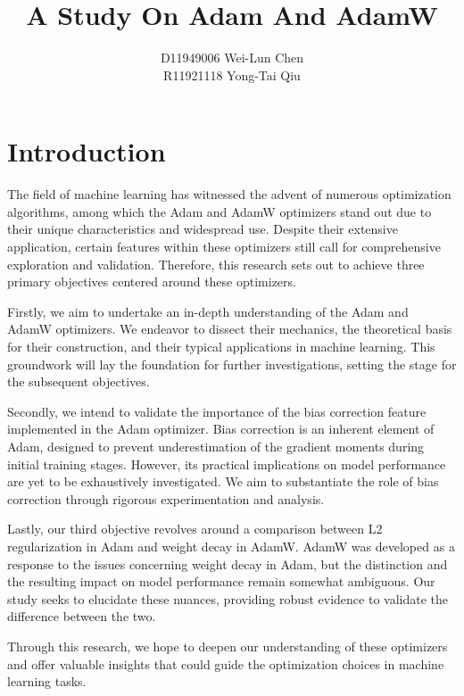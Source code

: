 \documentclass[14pt,twocolumn,letterpaper]{extarticle}
\begin{document}
\title{A Study On Adam And AdamW}
\author{D11949006 Wei-Lun Chen \\ R11921118 Yong-Tai Qiu}
\date{}
\maketitle

\section{Introduction}
The field of machine learning has witnessed the advent of numerous optimization algorithms, among which the Adam and AdamW optimizers stand out due to their unique characteristics and widespread use. Despite their extensive application, certain features within these optimizers still call for comprehensive exploration and validation. Therefore, this research sets out to achieve three primary objectives centered around these optimizers.\par
Firstly, we aim to undertake an in-depth understanding of the Adam and AdamW optimizers. We endeavor to dissect their mechanics, the theoretical basis for their construction, and their typical applications in machine learning. This groundwork will lay the foundation for further investigations, setting the stage for the subsequent objectives.\par
Secondly, we intend to validate the importance of the bias correction feature implemented in the Adam optimizer. Bias correction is an inherent element of Adam, designed to prevent underestimation of the gradient moments during initial training stages. However, its practical implications on model performance are yet to be exhaustively investigated. We aim to substantiate the role of bias correction through rigorous experimentation and analysis.\par
Lastly, our third objective revolves around a comparison between L2 regularization in Adam and weight decay in AdamW. AdamW was developed as a response to the issues concerning weight decay in Adam, but the distinction and the resulting impact on model performance remain somewhat ambiguous. Our study seeks to elucidate these nuances, providing robust evidence to validate the difference between the two.\par
Through this research, we hope to deepen our understanding of these optimizers and offer valuable insights that could guide the optimization choices in machine learning tasks.
\end{document}
